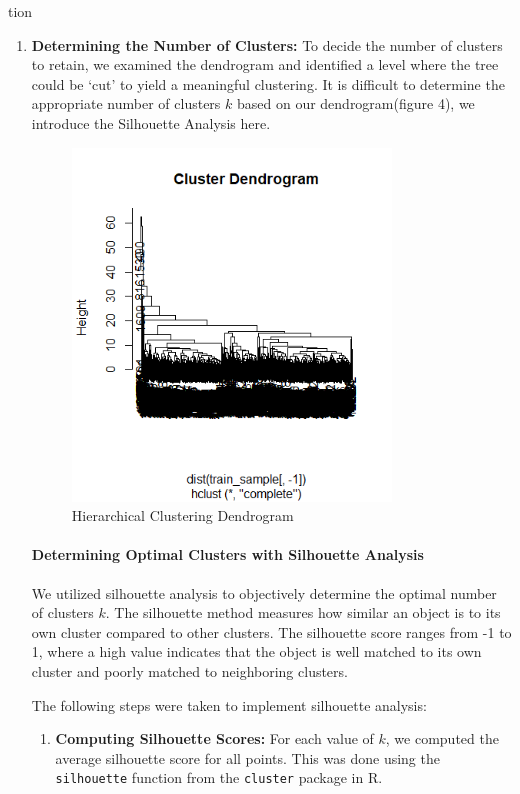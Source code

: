 tion\documentclass[8pt]{article}
\begin{document}
\begin{enumerate}
    \item \textbf{Determining the Number of Clusters:} To decide the number of clusters to retain, we examined the dendrogram and identified a level where the tree could be ‘cut’ to yield a meaningful clustering. It is difficult to determine the appropriate number of clusters \( k \) based on our dendrogram(figure 4), we introduce the Silhouette Analysis here.
\begin{figure}[h]
    \centering
    \includegraphics[width=0.8\textwidth]{unsupervised_figures/hclust_pca.png}
    \caption{Hierarchical Clustering Dendrogram}
    \label{fig:hierarchical_dendrogram}
\end{figure}
\paragraph{Determining Optimal Clusters with Silhouette Analysis}
We utilized silhouette analysis to objectively determine the optimal number of clusters \( k \). The silhouette method measures how similar an object is to its own cluster compared to other clusters. The silhouette score ranges from -1 to 1, where a high value indicates that the object is well matched to its own cluster and poorly matched to neighboring clusters.

The following steps were taken to implement silhouette analysis:

\begin{enumerate}
    \item \textbf{Computing Silhouette Scores:} For each value of \( k \), we computed the average silhouette score for all points. This was done using the \texttt{silhouette} function from the \texttt{cluster} package in R.
    

\end{enumerate}
\end{enumerate}
\end{document}
